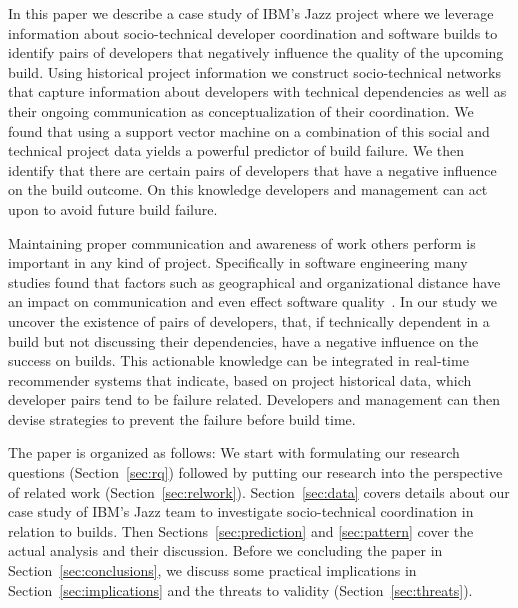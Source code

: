 \documentclass[12pt,oneside]{book}
\begin{document}
In this paper we describe a case study of IBM's Jazz project where we leverage
information about socio-technical developer coordination and software builds to
identify pairs of developers that negatively influence the quality of the
upcoming build. Using historical project information we construct socio-technical
networks that capture information about developers with technical dependencies
as well as their ongoing communication as conceptualization of their coordination.
We found that using a support vector machine on a combination of this social
and technical project data yields a powerful predictor of build failure. We
then identify that there are certain pairs of developers that have a
negative influence on the build outcome. On this knowledge developers and management can
act upon to avoid future build failure.

Maintaining proper communication and awareness of work others perform is
important in any kind of project. Specifically in software engineering many studies found
that factors such as geographical and organizational distance have an impact on
communication and even effect software quality~\cite{nagappan:icse:2008}. In our
study we uncover the existence of pairs of
developers, that, if technically dependent in a build but not discussing their
dependencies, have a negative influence on the success on builds. This
actionable knowledge can be integrated in real-time recommender systems that
indicate, based on project historical data, which developer pairs tend to be
failure related. Developers and management can then devise strategies to
prevent the failure before build time. 


The paper is organized as follows: We start with formulating our research
questions (Section~\ref{sec:rq}) followed by putting our research into the
perspective of related work (Section~\ref{sec:relwork}). Section~\ref{sec:data}
covers details about our case study of IBM's Jazz team to investigate
socio-technical coordination in relation to builds. Then
Sections~\ref{sec:prediction} and \ref{sec:pattern} cover the actual analysis and
their discussion. Before we concluding the paper in
Section~\ref{sec:conclusions}, we discuss some practical implications in Section~\ref{sec:implications} and the threats to validity
(Section~\ref{sec:threats}).



\end{document}
